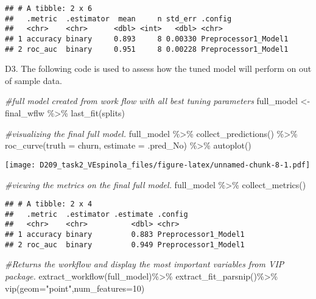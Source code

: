 \documentclass[
]{article}
\newenvironment{Shaded}{\begin{snugshade}}{\end{snugshade}}
\newcommand{\AttributeTok}[1]{\textcolor[rgb]{0.77,0.63,0.00}{#1}}
\newcommand{\CommentTok}[1]{\textcolor[rgb]{0.56,0.35,0.01}{\textit{#1}}}
\newcommand{\DecValTok}[1]{\textcolor[rgb]{0.00,0.00,0.81}{#1}}
\newcommand{\FunctionTok}[1]{\textcolor[rgb]{0.00,0.00,0.00}{#1}}
\newcommand{\NormalTok}[1]{#1}
\newcommand{\OtherTok}[1]{\textcolor[rgb]{0.56,0.35,0.01}{#1}}
\newcommand{\SpecialCharTok}[1]{\textcolor[rgb]{0.00,0.00,0.00}{#1}}
\newcommand{\StringTok}[1]{\textcolor[rgb]{0.31,0.60,0.02}{#1}}
\begin{document}
\begin{verbatim}
## # A tibble: 2 x 6
##   .metric  .estimator  mean     n std_err .config             
##   <chr>    <chr>      <dbl> <int>   <dbl> <chr>               
## 1 accuracy binary     0.893     8 0.00330 Preprocessor1_Model1
## 2 roc_auc  binary     0.951     8 0.00228 Preprocessor1_Model1
\end{verbatim}

D3. The following code is used to assess how the tuned model will
perform on out of sample data.

\begin{Shaded}
\begin{Highlighting}[]
\CommentTok{\#full model created from work flow with all best tuning parameters}
\NormalTok{full\_model }\OtherTok{\textless{}{-}}\NormalTok{ final\_wflw }\SpecialCharTok{\%\textgreater{}\%}
  \FunctionTok{last\_fit}\NormalTok{(splits)}

\CommentTok{\#visualizing the final full model. }
\NormalTok{full\_model }\SpecialCharTok{\%\textgreater{}\%} \FunctionTok{collect\_predictions}\NormalTok{() }\SpecialCharTok{\%\textgreater{}\%}
  \FunctionTok{roc\_curve}\NormalTok{(}\AttributeTok{truth =}\NormalTok{ churn, }\AttributeTok{estimate =}\NormalTok{ .pred\_No) }\SpecialCharTok{\%\textgreater{}\%}
  \FunctionTok{autoplot}\NormalTok{()}
\end{Highlighting}
\end{Shaded}

\texttt{[image: D209\_task2\_VEspinola\_files/figure-latex/unnamed-chunk-8-1.pdf]}

\begin{Shaded}
\begin{Highlighting}[]
\CommentTok{\#viewing the metrics on the final full model. }
\NormalTok{full\_model }\SpecialCharTok{\%\textgreater{}\%} \FunctionTok{collect\_metrics}\NormalTok{()}
\end{Highlighting}
\end{Shaded}

\begin{verbatim}
## # A tibble: 2 x 4
##   .metric  .estimator .estimate .config             
##   <chr>    <chr>          <dbl> <chr>               
## 1 accuracy binary         0.883 Preprocessor1_Model1
## 2 roc_auc  binary         0.949 Preprocessor1_Model1
\end{verbatim}

\begin{Shaded}
\begin{Highlighting}[]
\CommentTok{\#Returns the workflow and display the most important variables from VIP package. }
\FunctionTok{extract\_workflow}\NormalTok{(full\_model)}\SpecialCharTok{\%\textgreater{}\%}
  \FunctionTok{extract\_fit\_parsnip}\NormalTok{()}\SpecialCharTok{\%\textgreater{}\%}
  \FunctionTok{vip}\NormalTok{(}\AttributeTok{geom=}\StringTok{"point"}\NormalTok{,}\AttributeTok{num\_features=}\DecValTok{10}\NormalTok{)}
\end{Highlighting}
\end{Shaded}
\end{document}
